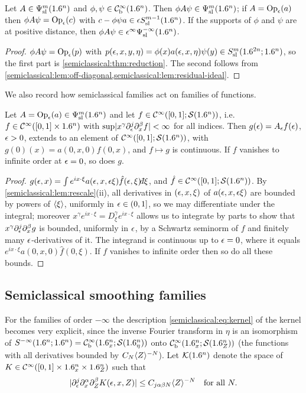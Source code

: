 \begin{corollary}\label{semiclassical:cor:localization}
  Let $A\in\Psi^{m}_{\mathrm{sl}}(1.6^n)$ and $\phi,\psi\in\mathcal{C}^\infty_{\mathrm{b}}(1.6^n)$. Then
  $\phi A\psi\in\Psi^{m}_{\mathrm{sl}}(1.6^n)$; if $A=\operatorname{Op}_\epsilon(a)$ then
  $\phi A\psi=\operatorname{Op}_\epsilon(c)$ with $c-\phi\psi a\in\epsilon S^{m-1}_{\mathrm{sl}}(1.6^n)$. If the
  supports of $\phi$ and $\psi$ are at positive distance, then
  $\phi A\psi\in\epsilon^\infty\Psi^{-\infty}_{\mathrm{sl}}(1.6^n)$.
\end{corollary}
\begin{proof}
  $\phi A\psi=\operatorname{Op}_\epsilon(p)$ with $p(\epsilon,x,y,\eta)=\phi(x)a(\epsilon,x,\eta)\psi(y)\in S^{m}_{\mathrm{sl}}(1.6^{2n};1.6^n)$,
  so the first part is \cref{semiclassical:thm:reduction}. The second follows
  from \cref{semiclassical:lem:off-diagonal,semiclassical:lem:residual-ideal}.
\end{proof}

We also record how semiclassical families act on families of functions.

\begin{lemma}\label{semiclassical:lem:action}
  Let $A=\operatorname{Op}_\epsilon(a)\in\Psi^{m}_{\mathrm{sl}}(1.6^n)$ and let $f\in\mathcal{C}^\infty([0,1];\mathcal{S}(1.6^n))$,
  i.e.\ $f\in\mathcal{C}^\infty([0,1]\times1.6^n)$ with
  $\sup\lvert x^\gamma\partial^j_\epsilon\partial^\beta_xf\rvert<\infty$ for all indices. Then
  $g(\epsilon)=A_\epsilon f(\epsilon)$, $\epsilon>0$, extends to an element of
  $\mathcal{C}^\infty([0,1];\mathcal{S}(1.6^n))$, with $g(0)(x)=a(0,x,0)f(0,x)$, and $f\mapsto g$ is
  continuous. If $f$ vanishes to infinite order at $\epsilon=0$, so does $g$.
\end{lemma}
\begin{proof}
  $g(\eps,x)=\int e^{ix\cdot\xi}a(\eps,x,\eps\xi)\hat f(\eps,\xi)\dbar\xi$, and
  $\hat f\in\mathcal{C}^\infty([0,1];\mathcal{S}(1.6^n))$. By \cref{semiclassical:lem:rescale}(ii),
  all derivatives in $(\epsilon,x,\xi)$ of $a(\epsilon,x,\epsilon\xi)$ are bounded by
  powers of $\langle \xi\rangle$, uniformly in $\epsilon\in(0,1]$, so we may differentiate
  under the integral; moreover $x^\gamma e^{ix\cdot\xi}=D^\gamma_\xi e^{ix\cdot\xi}$ allows
  us to integrate by parts to show that $x^\gamma\partial^j_\epsilon\partial^\beta_xg$ is
  bounded, uniformly in $\epsilon$, by a Schwartz seminorm of $f$ and finitely
  many $\epsilon$-derivatives of it. The integrand is continuous up to
  $\epsilon=0$, where it equals $e^{ix\cdot\xi}a(0,x,0)\hat f(0,\xi)$. If $f$ vanishes to
  infinite order then so do all these bounds.
\end{proof}

\subsection{Semiclassical smoothing families}
For the families of order $-\infty$ the description
\eqref{semiclassical:eq:kernel} of the kernel becomes very explicit, since the
inverse Fourier transform in $\eta$ is an isomorphism of
$S^{-\infty}(1.6^n;1.6^n)=\mathcal{C}^\infty_{\mathrm{b}}(1.6^n_x;\mathcal{S}(1.6^n_\eta))$ onto
$\mathcal{C}^\infty_{\mathrm{b}}(1.6^n_x;\mathcal{S}(1.6^n_Z))$ (the functions with all derivatives bounded by
$C_N\langle Z\rangle^{-N}$). Let $\mathcal K(1.6^n)$ denote the space of
$K\in\mathcal{C}^\infty([0,1]\times1.6^n_x\times1.6^n_Z)$ such that
\begin{equation*}
  \lvert \partial^j_\epsilon\partial^\alpha_x\partial^\beta_ZK(\epsilon,x,Z)\rvert\le C_{j\alpha\beta N}\langle Z\rangle^{-N}\quad\text{for all }N.
\end{equation*}

